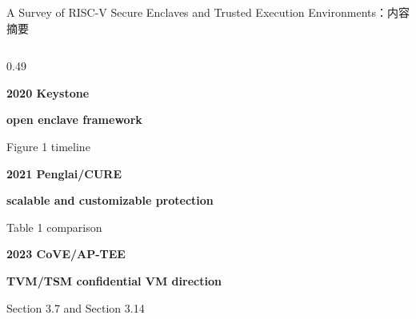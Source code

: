 \begin{frame}[t,shrink=6]{A Survey of RISC-V Secure Enclaves and Trusted Execution Environments：内容摘要}
\begin{columns}[T,totalwidth=\textwidth]
\begin{column}{0.49\textwidth}
{\begin{minipage}[t]{0.97\linewidth}
\begin{minipage}{0.92\linewidth}
\textcolor{Accent}{\bfseries 2020 Keystone}\par\textbf{open enclave framework}\par{\tiny\textcolor{Muted}{Figure 1 timeline}}\par\vspace{1.6mm}
\textcolor{Accent}{\bfseries 2021 Penglai/CURE}\par\textbf{scalable and customizable protection}\par{\tiny\textcolor{Muted}{Table 1 comparison}}\par\vspace{1.6mm}
\textcolor{Accent}{\bfseries 2023 CoVE/AP-TEE}\par\textbf{TVM/TSM confidential VM direction}\par{\tiny\textcolor{Muted}{Section 3.7 and Section 3.14}}\par\vspace{1.6mm}
    \end{minipage}
    \vspace{1mm}
  \end{minipage}}
  \end{column}
\end{columns}
\end{frame}


